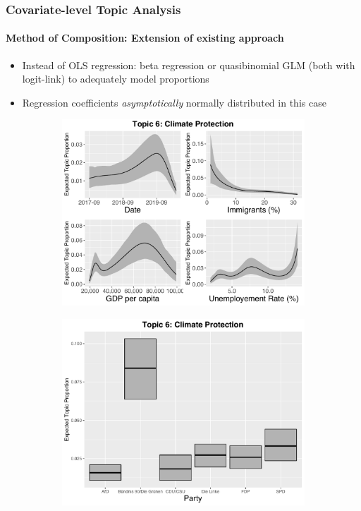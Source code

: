 \documentclass[xcolor=dvipsnames]{beamer}
\begin{document}
\begin{frame}
\frametitle{Covariate-level Topic Analysis}
\framesubtitle{Method of Composition: Extension of existing approach}
\begin{itemize}
\item Instead of OLS regression: beta regression or quasibinomial GLM (both with logit-link) to adequately model proportions
\item Regression coefficients \textit{asymptotically} normally distributed in this case
\end{itemize}
\begin{figure}[h!]
  \centering
  \captionsetup{justification=centering,margin=2cm}
  \begin{subfigure}[b]{0.4\linewidth}
    \includegraphics[width=\linewidth]{../plots/presentation/quasi_t6_cont.pdf}
  \end{subfigure}
  \begin{subfigure}[b]{0.4\linewidth}
    \includegraphics[width=\linewidth]{../plots/presentation/quasi_t6_cat.pdf}
  \end{subfigure}
\end{figure}
\end{frame}
\end{document}
